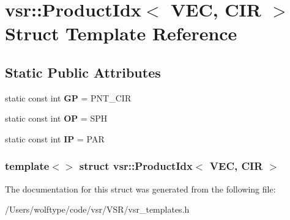 \hypertarget{structvsr_1_1_product_idx_3_01_v_e_c_00_01_c_i_r_01_4}{\section{vsr\-:\-:Product\-Idx$<$ V\-E\-C, C\-I\-R $>$ Struct Template Reference}
\label{structvsr_1_1_product_idx_3_01_v_e_c_00_01_c_i_r_01_4}
}
\subsection*{Static Public Attributes}
\begin{DoxyCompactItemize}
\item 
\hypertarget{structvsr_1_1_product_idx_3_01_v_e_c_00_01_c_i_r_01_4_a39cd22a2f57617a7b6f1daaea265118d}{static const int {\bfseries G\-P} = P\-N\-T\-\_\-\-C\-I\-R}\label{structvsr_1_1_product_idx_3_01_v_e_c_00_01_c_i_r_01_4_a39cd22a2f57617a7b6f1daaea265118d}

\item 
\hypertarget{structvsr_1_1_product_idx_3_01_v_e_c_00_01_c_i_r_01_4_a36255fcad2fe5f70afd98c06a97b9fc9}{static const int {\bfseries O\-P} = S\-P\-H}\label{structvsr_1_1_product_idx_3_01_v_e_c_00_01_c_i_r_01_4_a36255fcad2fe5f70afd98c06a97b9fc9}

\item 
\hypertarget{structvsr_1_1_product_idx_3_01_v_e_c_00_01_c_i_r_01_4_a3aaf3659eb861300f666376fb7d3c7ff}{static const int {\bfseries I\-P} = P\-A\-R}\label{structvsr_1_1_product_idx_3_01_v_e_c_00_01_c_i_r_01_4_a3aaf3659eb861300f666376fb7d3c7ff}

\end{DoxyCompactItemize}
\subsubsection*{template$<$$>$ struct vsr\-::\-Product\-Idx$<$ V\-E\-C, C\-I\-R $>$}



The documentation for this struct was generated from the following file\-:\begin{DoxyCompactItemize}
\item 
/\-Users/wolftype/code/vsr/\-V\-S\-R/vsr\-\_\-templates.\-h\end{DoxyCompactItemize}
